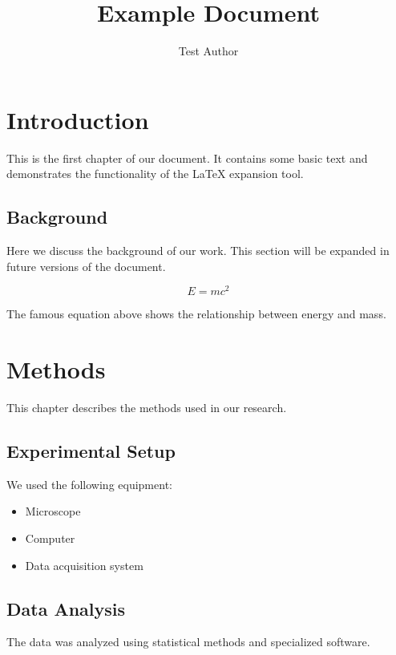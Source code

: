 \documentclass{article}
\title{Example Document}
\author{Test Author}
\begin{document}
\maketitle

\section{Introduction}

This is the first chapter of our document. It contains some basic text
and demonstrates the functionality of the LaTeX expansion tool.

\subsection{Background}

Here we discuss the background of our work. This section will be expanded
in future versions of the document.


\begin{equation}
E = mc^2
\end{equation}

The famous equation above shows the relationship between energy and mass.

\section{Methods}

This chapter describes the methods used in our research.

\subsection{Experimental Setup}

We used the following equipment:
\begin{itemize}
\item Microscope
\item Computer
\item Data acquisition system
\end{itemize}

\subsection{Data Analysis}

The data was analyzed using statistical methods and specialized software.
\end{document}
